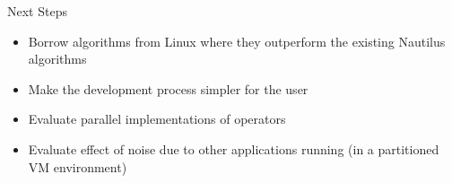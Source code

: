 \begin{block}{Next Steps}

  \begin{itemize}
  \item Borrow algorithms from Linux where they outperform the existing Nautilus algorithms
  \item Make the development process simpler for the user
  \item Evaluate parallel implementations of operators
  \item Evaluate effect of noise due to other applications running (in a partitioned VM environment)
  \end{itemize}

\end{block}

